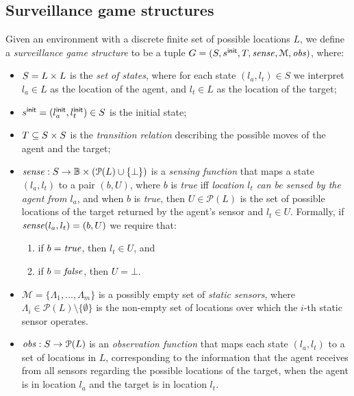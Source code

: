 \subsection{Surveillance game structures}\label{sec:surveillance-games}
Given an environment with a discrete finite set of possible locations $L$, we define a \emph{surveillance game structure} to be  a tuple $G  = (S,s^{\mathsf{init}},T,\mathit{sense},\mathcal{M},\mathit{obs})$, where:
\begin{itemize}
\item $S = L \times L$ is the \emph{set of states}, where for each state $(l_a,l_t) \in S$ we interpret $l_a \in L$ as the location of the agent, and $l_t \in L$ as the location of the target;
\item $s^{\mathsf{init}} = (l_a^{\mathsf{init}},l_t^{\mathsf{init}}) \in S$ is the initial state;
\item $T \subseteq S \times S$ is the \emph{transition relation} describing the possible moves of the agent and the target; 
\item $\mathit{sense} : S \to \mathbb{B} \times (\mathcal{P}(L)\cup \{\bot\})$ is a \emph{sensing function} that maps a state $(l_a,l_t)$ to a pair $(b,U)$, where $b$ is \emph{true} iff \emph{location $l_t$ can be sensed by the agent from $l_a$}, and when $b$ is \emph{true}, then $U \in \mathcal{P}(L)$ is the set of possible locations of the target returned by the agent's sensor and $l_t \in U$. Formally, if $\mathit{sense}(l_a,l_t) = (b,U)$ we require that:
\begin{enumerate}
    \item if $b = \mathit{true}$, then $l_t \in U$, and
    \item if $b = \mathit{false}$, then $U = \bot$.
\end{enumerate}
\item $\mathcal{M} = \{\Lambda_1,\dots,\Lambda_m\}$ is a possibly empty set of \emph{static sensors}, where $\Lambda_i \in \mathcal{P}(L) \setminus \{\emptyset\}$ is the non-empty set of locations over which the $i$-th static sensor operates.
\item $\mathit{obs} : S \to \mathcal{P}(L)$ is an \emph{observation function} that maps each state $(l_a,l_t)$ to a set of locations in $L$, corresponding to the information that the agent receives from all sensors regarding the possible locations of the target, when the agent is in location $l_a$ and the target is in location $l_t$.
\end{itemize}

